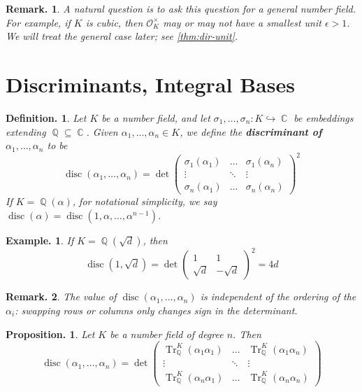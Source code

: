 \documentclass[11pt, a4paper]{memoir}
\DeclareMathOperator{\Q}{{\mathbb{Q}}}
\DeclareMathOperator{\C}{{\mathbb{C}}}
\newcommand{\hto}[0]{\ensuremath{\hookrightarrow}}
\theoremstyle{change}
\newtheorem{proposition}[theorem]{Proposition.}
\theoremstyle{plain}
\theoremstyle{nonumberplain}
\newtheorem{definition}{Definition.}
\newtheorem{example}{Example.}
\newtheorem{remark}{Remark.}
\DeclareMathOperator{\disc}{disc}
\DeclareMathOperator{\Tr}{Tr}
\numberwithin{equation}{section}
\begin{document}
\begin{remark}
    A natural question is to ask this question for a general number field.
    For example, if $K$ is cubic, then $\mathcal{O}_K^\times$ may or may not have a smallest unit $\epsilon>1$.
    We will treat the general case later; see \cref{thm:dir-unit}.
\end{remark}
\section{Discriminants, Integral Bases}
\begin{definition}
    Let $K$ be a number field, and let $\sigma_1,\ldots,\sigma_n:K\hto\C$ be embeddings extending $\Q\subseteq\C$.
    Given $\alpha_1,\ldots,\alpha_n\in K$, we define the \textbf{discriminant of $\alpha_1,\ldots,\alpha_n$} to be
    \begin{equation*}
        \disc(\alpha_1,\ldots,\alpha_n)=\det
        \begin{pmatrix}
            \sigma_1(\alpha_1) & \hdots & \sigma_1(\alpha_n)\\
            \vdots &\ddots&\vdots\\
            \sigma_n(\alpha_1) & \hdots & \sigma_n(\alpha_n)
        \end{pmatrix}^2
    \end{equation*}
    If $K=\Q(\alpha)$, for notational simplicity, we say $\disc(\alpha)=\disc(1,\alpha,\ldots,\alpha^{n-1})$.
\end{definition}
\begin{example}
    If $K=\Q(\sqrt{d})$, then
    \begin{equation*}\disc(1,\sqrt{d})=\det\begin{pmatrix}1&1\\\sqrt{d}&-\sqrt{d}\end{pmatrix}^2=4d\end{equation*}
\end{example}
\begin{remark}
    The value of $\disc(\alpha_1,\ldots,\alpha_n)$ is independent of the ordering of the $\alpha_i$: swapping rows or columns only changes sign in the determinant.
\end{remark}
\begin{proposition}
    Let $K$ be a number field of degree $n$.
    Then
    \begin{equation*}
        \disc(\alpha_1,\ldots,\alpha_n)=\det
        \begin{pmatrix}
            \Tr_{\Q}^K(\alpha_1\alpha_1)&\hdots&\Tr_{\Q}^K(\alpha_1\alpha_n)\\
            \vdots&\ddots&\vdots\\
            \Tr_{\Q}^K(\alpha_n\alpha_1)&\hdots&\Tr_{\Q}^K(\alpha_n\alpha_n)
        \end{pmatrix}
    \end{equation*}
\end{proposition}
\end{document}
